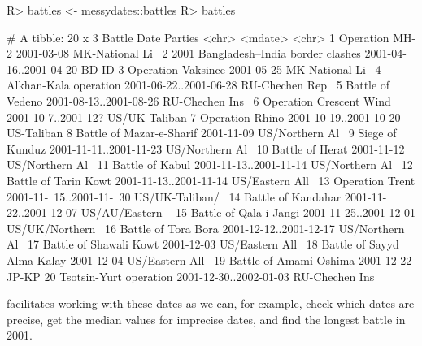 \documentclass[
]{jss}
\begin{document}
\begin{CodeChunk}
\begin{CodeInput}
R> battles <- messydates::battles
R> battles
\end{CodeInput}
\begin{CodeOutput}
# A tibble: 20 x 3
   Battle                               Date                     Parties        
   <chr>                                <mdate>                  <chr>          
 1 Operation MH-2                       2001-03-08               MK-National Li~
 2 2001 Bangladesh–India border clashes 2001-04-16..2001-04-20   BD-ID          
 3 Operation Vaksince                   2001-05-25               MK-National Li~
 4 Alkhan-Kala operation                2001-06-22..2001-06-28   RU-Chechen Rep~
 5 Battle of Vedeno                     2001-08-13..2001-08-26   RU-Chechen Ins~
 6 Operation Crescent Wind              2001-10-7..2001-12?      US/UK-Taliban  
 7 Operation Rhino                      2001-10-19..2001-10-20   US-Taliban     
 8 Battle of Mazar-e-Sharif             2001-11-09               US/Northern Al~
 9 Siege of Kunduz                      2001-11-11..2001-11-23   US/Northern Al~
10 Battle of Herat                      2001-11-12               US/Northern Al~
11 Battle of Kabul                      2001-11-13..2001-11-14   US/Northern Al~
12 Battle of Tarin Kowt                 2001-11-13..2001-11-14   US/Eastern All~
13 Operation Trent                      2001-11-~15..2001-11-~30 US/UK-Taliban/~
14 Battle of Kandahar                   2001-11-22..2001-12-07   US/AU/Eastern ~
15 Battle of Qala-i-Jangi               2001-11-25..2001-12-01   US/UK/Northern~
16 Battle of Tora Bora                  2001-12-12..2001-12-17   US/Northern Al~
17 Battle of Shawali Kowt               2001-12-03               US/Eastern All~
18 Battle of Sayyd Alma Kalay           2001-12-04               US/Eastern All~
19 Battle of Amami-Oshima               2001-12-22               JP-KP          
20 Tsotsin-Yurt operation               2001-12-30..2002-01-03   RU-Chechen Ins~
\end{CodeOutput}
\end{CodeChunk}

 facilitates working with these dates as we can, for
example, check which dates are precise, get the median values for
imprecise dates, and find the longest battle in 2001.
\end{document}
